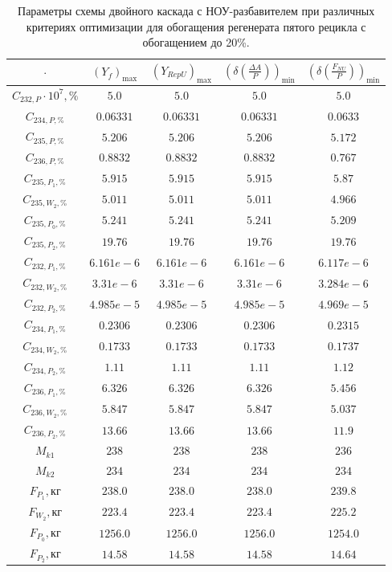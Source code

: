 \begin{table}
    \centering
    \begin{tabular}{|c|cccc|}
        \hline $\cdot$ & $(Y_f)_\text{max}$ & $(Y_{RepU})_\text{max}$ & $(\delta(\frac{\Delta A}{P}))_\text{min}$ & $(\delta(\frac{F_{NU}}{P}))_\text{min}$\\ \hline
        $C_{232,P}\cdot10^{7}, \%$ & $5.0$ & $5.0$ & $5.0$ & $5.0$\\ \hline
        $C_{234,P, \%}$ & $0.06331$ & $0.06331$ & $0.06331$ & $0.0633$\\ \hline
        $C_{235,P, \%}$ & $5.206$ & $5.206$ & $5.206$ & $5.172$\\ \hline
        $C_{236,P, \%}$ & $0.8832$ & $0.8832$ & $0.8832$ & $0.767$\\ \hline
        $C_{235,P_1, \%}$ & $5.915$ & $5.915$ & $5.915$ & $5.87$\\ \hline
        $C_{235,W_2, \%}$ & $5.011$ & $5.011$ & $5.011$ & $4.966$\\ \hline
        $C_{235,P_0, \%}$ & $5.241$ & $5.241$ & $5.241$ & $5.209$\\ \hline
        $C_{235,P_2, \%}$ & $19.76$ & $19.76$ & $19.76$ & $19.76$\\ \hline
        $C_{232,P_1, \%}$ & $6.161e-6$ & $6.161e-6$ & $6.161e-6$ & $6.117e-6$\\ \hline
        $C_{232,W_2, \%}$ & $3.31e-6$ & $3.31e-6$ & $3.31e-6$ & $3.284e-6$\\ \hline
        $C_{232,P_2, \%}$ & $4.985e-5$ & $4.985e-5$ & $4.985e-5$ & $4.969e-5$\\ \hline
        $C_{234,P_1, \%}$ & $0.2306$ & $0.2306$ & $0.2306$ & $0.2315$\\ \hline
        $C_{234,W_2, \%}$ & $0.1733$ & $0.1733$ & $0.1733$ & $0.1737$\\ \hline
        $C_{234,P_2, \%}$ & $1.11$ & $1.11$ & $1.11$ & $1.12$\\ \hline
        $C_{236,P_1, \%}$ & $6.326$ & $6.326$ & $6.326$ & $5.456$\\ \hline
        $C_{236,W_2, \%}$ & $5.847$ & $5.847$ & $5.847$ & $5.037$\\ \hline
        $C_{236,P_2, \%}$ & $13.66$ & $13.66$ & $13.66$ & $11.9$\\ \hline
        $M_{k1}$ & $238$ & $238$ & $238$ & $236$\\ \hline
        $M_{k2}$ & $234$ & $234$ & $234$ & $234$\\ \hline
        $F_{P_1}, \text{кг}$ & $238.0$ & $238.0$ & $238.0$ & $239.8$\\ \hline
        $F_{W_2}, \text{кг}$ & $223.4$ & $223.4$ & $223.4$ & $225.2$\\ \hline
        $F_{P_0}, \text{кг}$ & $1256.0$ & $1256.0$ & $1256.0$ & $1254.0$\\ \hline
        $F_{P_2}, \text{кг}$ & $14.58$ & $14.58$ & $14.58$ & $14.64$\\ \hline
    \end{tabular}
    \caption{Параметры схемы двойного каскада с НОУ-разбавителем при различных критериях оптимизации для обогащения регенерата пятого рецикла с обогащением до 20\%.{\label{2opt5_20}}}
\end{table}


